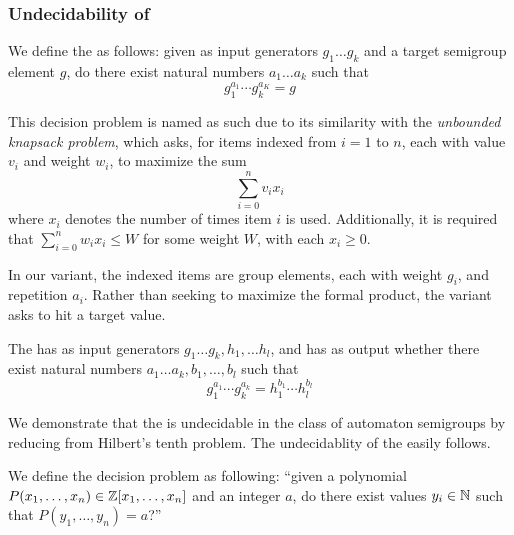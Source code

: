 \documentclass[11pt, titlepage]{article}
\begin{document}
\subsubsection{Undecidability of }

\begin{definition}
  We define the  as follows: given as input
  generators $g_1 \ldots g_k$ and a target semigroup element $g$, do
  there exist natural numbers $a_1\ldots a_k$ such that
  \[ g_1^{a_1} \cdots g_k^{a_K} = g \]
\end{definition}

This decision problem is named as such due to its similarity with the
\emph{unbounded knapsack problem}, which asks, for items indexed from
$i = 1$ to $n$, each with value $v_i$ and weight $w_i$, to maximize
the sum
\[
  \sum_{i=0}^n v_i x_i
\]
where $x_i$ denotes the number of times item $i$ is
used. Additionally, it is required that $\sum_{i=0}^nw_ix_i \leq W$
for some weight $W$, with each $x_i \geq 0$.

In our variant, the indexed items are group elements, each with weight
$g_i$, and repetition $a_i$. Rather than seeking to maximize the
formal product, the variant asks to hit a target value.

\begin{definition}
  The  has as input generators
  $g_1 \ldots g_k, h_1, \ldots h_l$, and has as output whether there
  exist natural numbers $a_1\ldots a_k, b_1, \ldots, b_l$ such that
  \[ g_1^{a_1} \cdots g_k^{a_k} = h_1^{b_1} \cdots h_l^{b_l} \]
\end{definition}

We demonstrate that the  is
undecidable in the class of automaton semigroups by reducing from
Hilbert's tenth problem. The undecidablity of the  easily follows.

\begin{definition}
  We define the decision problem  as following:
  ``given a polynomial $P(x_1, \ldots, x_n) \in \mathbb{Z}[x_1, \ldots, x_n]$
  and an integer $a$, do there exist values $y_i \in \mathbb{N}$ such that
  $P(y_1, \ldots, y_n) = a$?''
\end{definition}
\end{document}
